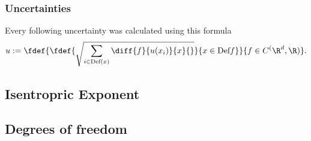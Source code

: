 \documentclass[../main.tex]{subfiles}
\begin{document}
    \subsubsection*{Uncertainties}
        Every following uncertainty was calculated using this formula
        \[u:=\fdef{\fdef{\sqrt{\sum_{i\in\text{Def}(x)}\diff{f}{u(x_i)}{x}{}}}{x\in\text{Def}{f}}}{f\in C^(\R^d,\R)}.\]
		        
        
    \subsection{Isentropric Exponent}

    \subsection{Degrees of freedom}
        
\end{document}
